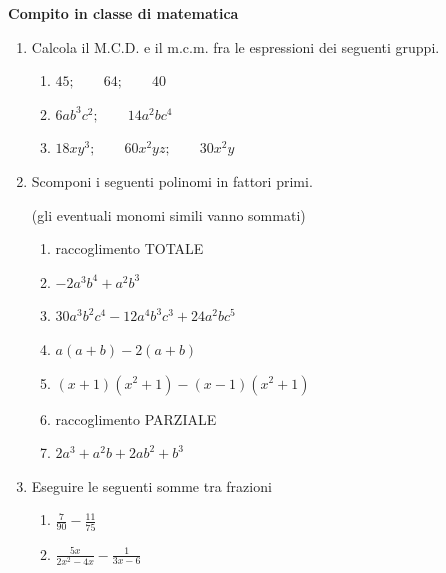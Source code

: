 \documentclass[14pt]{extarticle}
\begin{document}


\begin{center}
{\bf Compito in classe di matematica}
\end{center}



\begin{enumerate}[label=\bfseries\arabic*)]
	\item Calcola il M.C.D. e il m.c.m. fra le espressioni dei seguenti gruppi.
		\begin{enumerate}
			\item
				$
					45;\qquad 64;\qquad 40
				$
			\item
				$
					6ab^3c^2;\qquad 14a^2bc^4			
				$				
			\item
				$
					18xy^3; \qquad 60x^2yz; \qquad 30 x^2y			
				$
		\end{enumerate}
	
	\item Scomponi i seguenti polinomi in fattori primi. 

	\vspace{-10pt}

	{\tiny (gli eventuali monomi simili vanno sommati)}
	
		\begin{enumerate}
			
			\item[] raccoglimento TOTALE 
			\item
				$
					-2a^3b^4 + a^2b^3
				$
			\item
				$
					30a^3b^2c^4 - 12a^4b^3c^3 + 24a^2bc^5 
				$
			\item
				$
					a\left( a + b \right) - 2\left( a + b \right)
				$			
			\item
				$
					\left( x + 1 \right)\left( x^2 + 1 \right) - \left( x - 1 \right)\left( x^2 + 1 \right)
				$


			\item[] raccoglimento PARZIALE 
			
			\item 
					$
						2a^3 + a^2b + 2ab^2 + b^3
					$


		\end{enumerate}
	
		\item Eseguire le seguenti somme tra frazioni
			\begin{enumerate}
				\item
					$
						\frac{7}{90} - \frac{11}{75}
					$				
				\item
					$
						\frac{5x}{2x^2 - 4x} - \frac{1}{3x - 6}
					$
			\end{enumerate}
		

\end{enumerate}
\end{document}
